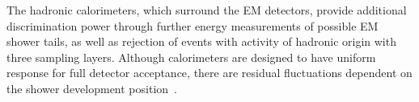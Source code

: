 
The hadronic calorimeters, which surround the EM detectors,
provide additional discrimination power through further energy measurements of
possible EM shower tails, as well as rejection of events with activity of
hadronic origin with three sampling layers. Although calorimeters are designed 
to have uniform response for full detector acceptance, there are residual fluctuations 
dependent on the shower development position~\cite{Wigmans2017}.



